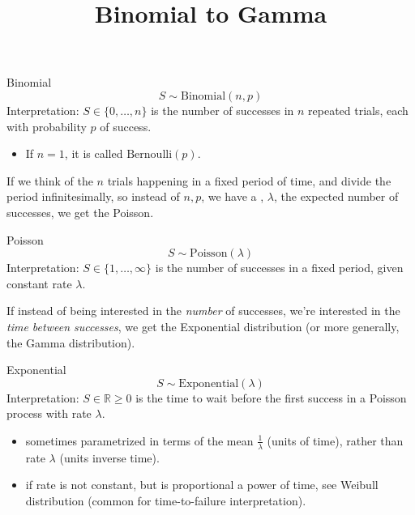 \documentclass{article}
\theoremstyle{definition}
\newcommand\key[1]{\myuline{#1}}
\begin{document}
\title{Binomial to Gamma}
\author{}%
\date{}

\maketitle
\begin{kast}{Binomial}
\begin{equation}
S \sim \mathrm{Binomial}(n,p)
\end{equation}
Interpretation: $S\in \{0,\ldots,n\}$ is the number of successes in $n$ repeated trials,
each with probability $p$ of success.
\begin{itemize}
  \item If $n=1$, it is called $\mathrm{Bernoulli}(p)$.
\end{itemize}
\end{kast}

If we think of the $n$ trials happening in a fixed period of time, and divide
the period infinitesimally, so instead of $n,p$, we have a \key{rate},
$\lambda$, the expected number of successes, we get the Poisson.

\begin{kast}{Poisson}
  \begin{equation}
    S \sim \mathrm{Poisson}(\lambda)
  \end{equation}
  Interpretation: $S\in\{1,\ldots,\infty\}$ is the number of successes in a
  fixed period, given constant rate $\lambda$.
\end{kast}

If instead of being interested in the \emph{number} of successes, we're
interested in the \emph{time between successes}, we get the Exponential
distribution (or more generally, the Gamma distribution).

\begin{kast}{Exponential}
  \begin{equation}
    S \sim \mathrm{Exponential}(\lambda)
  \end{equation}
  Interpretation: $S\in \mathbb{R} \ge 0$ is the time to wait before the first
  success in a Poisson process with rate $\lambda$.
  \begin{itemize}
    \item sometimes parametrized in terms of the mean $\frac{1}{\lambda}$ (units
      of time), rather than rate $\lambda$ (units inverse time).
    \item if rate is not constant, but is proportional a power of time, see
      Weibull distribution (common for time-to-failure interpretation).
  \end{itemize}
\end{kast}
\end{document}
